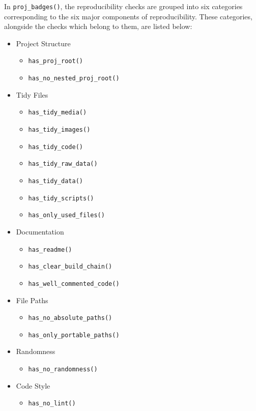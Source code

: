 \documentclass[12pt,twoside]{reedthesis}
\providecommand{\tightlist}{%
  \setlength{\itemsep}{0pt}\setlength{\parskip}{0pt}}
\begin{document}
In \texttt{proj\_badges()}, the reproducibility checks are grouped into
six categories corresponding to the six major components of
reproducibility. These categories, alongside the checks which belong to
them, are listed below:
\begin{itemize}
\tightlist
\item
  Project Structure
  \begin{itemize}
  \tightlist
  \item
    \texttt{has\_proj\_root()}
  \item
    \texttt{has\_no\_nested\_proj\_root()}
  \end{itemize}
\item
  Tidy Files
  \begin{itemize}
  \tightlist
  \item
    \texttt{has\_tidy\_media()}
  \item
    \texttt{has\_tidy\_images()}
  \item
    \texttt{has\_tidy\_code()}
  \item
    \texttt{has\_tidy\_raw\_data()}
  \item
    \texttt{has\_tidy\_data()}
  \item
    \texttt{has\_tidy\_scripts()}
  \item
    \texttt{has\_only\_used\_files()}
  \end{itemize}
\item
  Documentation
  \begin{itemize}
  \tightlist
  \item
    \texttt{has\_readme()}
  \item
    \texttt{has\_clear\_build\_chain()}
  \item
    \texttt{has\_well\_commented\_code()}
  \end{itemize}
\item
  File Paths
  \begin{itemize}
  \tightlist
  \item
    \texttt{has\_no\_absolute\_paths()}
  \item
    \texttt{has\_only\_portable\_paths()}
  \end{itemize}
\item
  Randomness
  \begin{itemize}
  \tightlist
  \item
    \texttt{has\_no\_randomness()}
  \end{itemize}
\item
  Code Style
  \begin{itemize}
  \tightlist
  \item
    \texttt{has\_no\_lint()}
  \end{itemize}
\end{itemize}
\end{document}
